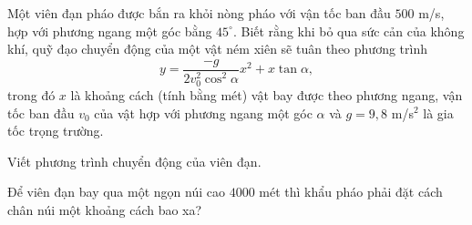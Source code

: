 \begin{bt}%
	Một viên đạn pháo được bắn ra khỏi nòng pháo với vận tốc ban đầu $500$ m/s, hợp với phương ngang một góc bằng $45^\circ$. Biết rằng khi bỏ qua sức cản của không khí, quỹ đạo chuyển động của một vật ném xiên sẽ tuân theo phương trình
	$$y=\dfrac{-g}{2v_0^2\cos^2\alpha}x^2+x\tan \alpha,$$
	trong đó $x$ là khoảng cách (tính bằng mét) vật bay được theo phương ngang, vận tốc ban đầu $v_0$ của vật hợp với phương ngang một góc $\alpha$ và $g=9{,}8$ m/s$^2$ là gia tốc trọng trường.
	\begin{listEX}[1]
		\item Viết phương trình chuyển động của viên đạn.
		\item Để viên đạn bay qua một ngọn núi cao $4000$ mét thì khẩu pháo phải đặt cách chân núi một khoảng cách bao xa?		
	\end{listEX}
\end{bt}

